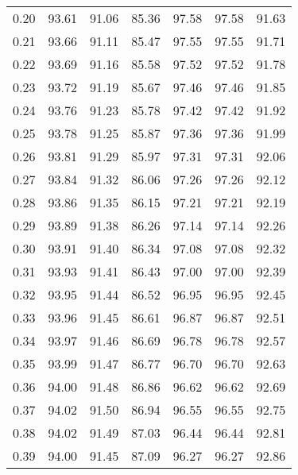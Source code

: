 \begin{tabular}{|c|c|c|c|c|c|c|}
      0.20 &     93.61 &     91.06 &      85.36 &   97.58 &      97.58 &         91.63 \\
      0.21 &     93.66 &     91.11 &      85.47 &   97.55 &      97.55 &         91.71 \\
      0.22 &     93.69 &     91.16 &      85.58 &   97.52 &      97.52 &         91.78 \\
      0.23 &     93.72 &     91.19 &      85.67 &   97.46 &      97.46 &         91.85 \\
      0.24 &     93.76 &     91.23 &      85.78 &   97.42 &      97.42 &         91.92 \\
      0.25 &     93.78 &     91.25 &      85.87 &   97.36 &      97.36 &         91.99 \\
      0.26 &     93.81 &     91.29 &      85.97 &   97.31 &      97.31 &         92.06 \\
      0.27 &     93.84 &     91.32 &      86.06 &   97.26 &      97.26 &         92.12 \\
      0.28 &     93.86 &     91.35 &      86.15 &   97.21 &      97.21 &         92.19 \\
      0.29 &     93.89 &     91.38 &      86.26 &   97.14 &      97.14 &         92.26 \\
      0.30 &     93.91 &     91.40 &      86.34 &   97.08 &      97.08 &         92.32 \\
      0.31 &     93.93 &     91.41 &      86.43 &   97.00 &      97.00 &         92.39 \\
      0.32 &     93.95 &     91.44 &      86.52 &   96.95 &      96.95 &         92.45 \\
      0.33 &     93.96 &     91.45 &      86.61 &   96.87 &      96.87 &         92.51 \\
      0.34 &     93.97 &     91.46 &      86.69 &   96.78 &      96.78 &         92.57 \\
      0.35 &     93.99 &     91.47 &      86.77 &   96.70 &      96.70 &         92.63 \\
      0.36 &     94.00 &     91.48 &      86.86 &   96.62 &      96.62 &         92.69 \\
      0.37 &     94.02 &     91.50 &      86.94 &   96.55 &      96.55 &         92.75 \\
      0.38 &     94.02 &     91.49 &      87.03 &   96.44 &      96.44 &         92.81 \\
      0.39 &     94.00 &     91.45 &      87.09 &   96.27 &      96.27 &         92.86 \\

\end{tabular}
